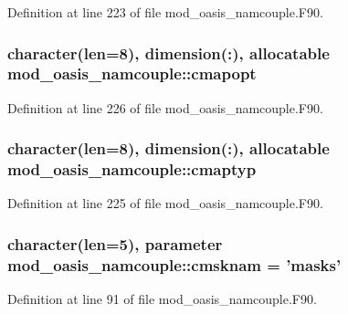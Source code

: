Definition at line 223 of file mod\+\_\+oasis\+\_\+namcouple.\+F90.

\hypertarget{classmod__oasis__namcouple_a3d7b34ed13d4ad8f86bbab3ad9956b6b}{
\subsubsection[{cmapopt}]{\setlength{\rightskip}{0pt plus 5cm}character(len=8), dimension(\+:), allocatable mod\+\_\+oasis\+\_\+namcouple\+::cmapopt\hspace{0.3cm}{\ttfamily [private]}}}\label{classmod__oasis__namcouple_a3d7b34ed13d4ad8f86bbab3ad9956b6b}


Definition at line 226 of file mod\+\_\+oasis\+\_\+namcouple.\+F90.

\hypertarget{classmod__oasis__namcouple_a82b32aa4c78713443daf65a3dfbc75dc}{
\subsubsection[{cmaptyp}]{\setlength{\rightskip}{0pt plus 5cm}character(len=8), dimension(\+:), allocatable mod\+\_\+oasis\+\_\+namcouple\+::cmaptyp\hspace{0.3cm}{\ttfamily [private]}}}\label{classmod__oasis__namcouple_a82b32aa4c78713443daf65a3dfbc75dc}


Definition at line 225 of file mod\+\_\+oasis\+\_\+namcouple.\+F90.

\hypertarget{classmod__oasis__namcouple_aeeda85bec8a449e87411d4ed404322c5}{
\subsubsection[{cmsknam}]{\setlength{\rightskip}{0pt plus 5cm}character(len=5), parameter mod\+\_\+oasis\+\_\+namcouple\+::cmsknam = 'masks'\hspace{0.3cm}{\ttfamily [private]}}}\label{classmod__oasis__namcouple_aeeda85bec8a449e87411d4ed404322c5}


Definition at line 91 of file mod\+\_\+oasis\+\_\+namcouple.\+F90.


